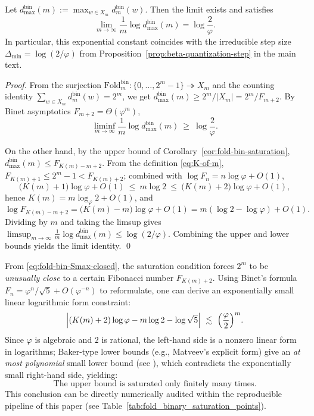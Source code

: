 \begin{theorem}\label{thm:fold-bin-max-fiber-exponent}
Let \(d^{\mathrm{bin}}_{\max}(m):=\max_{w\in X_m} d^{\mathrm{bin}}_m(w)\).
Then the limit exists and satisfies
\[
\lim_{m\to\infty}\frac{1}{m}\log d^{\mathrm{bin}}_{\max}(m)=\log\frac{2}{\varphi}.
\]
In particular, this exponential constant coincides with the irreducible step size \(\Delta_{\min}=\log(2/\varphi)\) from Proposition~\ref{prop:beta-quantization-step} in the main text.
\end{theorem}
\begin{proof}
From the surjection \(\mathrm{Fold}^{\mathrm{bin}}_m:\{0,\dots,2^m-1\}\twoheadrightarrow X_m\) and the counting identity
\(
\sum_{w\in X_m} d^{\mathrm{bin}}_m(w)=2^m
\),
we get
\(
d^{\mathrm{bin}}_{\max}(m)\ge 2^m/|X_m|
=2^m/F_{m+2}
\).
By Binet asymptotics \(F_{m+2}=\Theta(\varphi^{m})\),
\[
\liminf_{m\to\infty}\frac{1}{m}\log d^{\mathrm{bin}}_{\max}(m)\ \ge\ \log\frac{2}{\varphi}.
\]
\par
On the other hand, by the upper bound of Corollary~\ref{cor:fold-bin-saturation},
\(
d^{\mathrm{bin}}_{\max}(m)\le F_{K(m)-m+2}
\).
From the definition \eqref{eq:K-of-m},
\(
F_{K(m)+1}\le 2^m-1 < F_{K(m)+2}
\);
combined with \(\log F_n=n\log\varphi+O(1)\),
\[
\bigl(K(m)+1\bigr)\log\varphi+O(1)\ \le\ m\log 2\ \le\ \bigl(K(m)+2\bigr)\log\varphi+O(1),
\]
hence \(K(m)=m\log_{\varphi}2+O(1)\), and
\[
\log F_{K(m)-m+2}=\bigl(K(m)-m\bigr)\log\varphi+O(1)
=m(\log 2-\log\varphi)+O(1).
\]
Dividing by \(m\) and taking the limsup gives
\(
\limsup_{m\to\infty}\frac{1}{m}\log d^{\mathrm{bin}}_{\max}(m)\le \log(2/\varphi)
\).
Combining the upper and lower bounds yields the limit identity. \qed
\end{proof}
\begin{remark}\label{rem:fold-bin-finite}
From \eqref{eq:fold-bin-Smax-closed}, the saturation condition forces \(2^m\) to be \emph{unusually close} to a certain Fibonacci number \(F_{K(m)+2}\).
Using Binet's formula \(F_n=\varphi^n/\sqrt5+O(\varphi^{-n})\) to reformulate, one can derive an exponentially small linear logarithmic form constraint:
\[
\Bigl|(K(m)+2)\log\varphi - m\log 2 - \log\sqrt5\Bigr|
\ \lesssim\ \Bigl(\frac{\varphi}{2}\Bigr)^m.
\]
Since \(\varphi\) is algebraic and \(2\) is rational, the left-hand side is a nonzero linear form in logarithms; Baker-type lower bounds (e.g., Matveev's explicit form) give an \emph{at most polynomial} small lower bound (see \cite{Matveev2000LinearFormsLogs,BakerWustholz2007LogarithmicForms}), which contradicts the exponentially small right-hand side, yielding:
\[
\text{The upper bound is saturated only finitely many times.}
\]
This conclusion can be directly numerically audited within the reproducible pipeline of this paper (see Table~\ref{tab:fold_binary_saturation_points}).
\end{remark}
